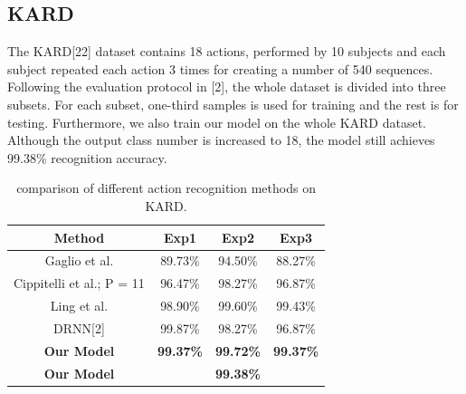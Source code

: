 \documentclass{bmvc2k}
\begin{document}
\subsection*{KARD}

The KARD[22] dataset contains 18 actions, performed by 10 subjects and each subject repeated each action 3 times for creating a number of 540 sequences. Following the evaluation protocol in [2], the whole dataset is divided into three subsets. For each subset, one-third samples is used for training and the rest is for testing. Furthermore, we also train our model on the whole KARD dataset. Although the output class number is increased to 18, the model still achieves 99.38\% recognition accuracy.

\begin{table}[htb]
	\begin{center}
		\caption{ comparison of different action recognition methods on KARD. }
		\scalebox{1.1}
		{
		\begin{tabular}{|c|c|c|c|}
			\hline
			Method & Exp1 & Exp2 & Exp3 \\
			\hline
			Gaglio et al. & 89.73\% & 94.50\%&88.27\%\\
			\hline
			Cippitelli et al.; P = 11 & 96.47\% & 98.27\% & 96.87\%\\
			\hline
			Ling et al. & 98.90\% & 99.60\% & 99.43\%\\
			\hline
			DRNN[2] & 99.87\% & 98.27\% & 96.87\%\\
			\hline
			\textbf{Our Model} & \textbf{99.37\%} & \textbf{99.72\%} & \textbf{99.37\%} \\
			\hline
			\textbf{Our Model} &  \multicolumn{3}{|c|}{\textbf{99.38\%}}\\
			\hline
		\end{tabular}
		}
	\end{center}
	
	\label{tab:2}
\end{table}
\end{document}
